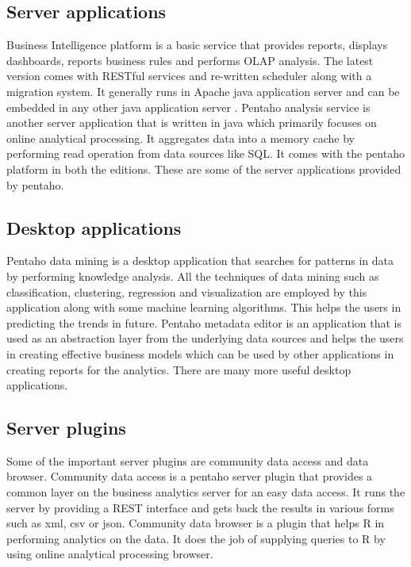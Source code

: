\documentclass[9pt,twocolumn,twoside]{styles/osajnl}
\begin{document}
\subsection{Server applications}

Business Intelligence platform is a basic service that provides
reports, displays dashboards, reports business rules and performs OLAP
analysis. The latest version comes with RESTful services and
re-written scheduler along with a migration system. It generally runs
in Apache java application server and can be embedded in any other
java application server \cite{pent1}. Pentaho analysis service is
another server application that is written in java which primarily
focuses on online analytical processing. It aggregates data into a
memory cache by performing read operation from data sources like
SQL. It comes with the pentaho platform in both the editions. These
are some of the server applications provided by pentaho.

\subsection{Desktop applications}

Pentaho data mining is a desktop application that searches for
patterns in data by performing knowledge analysis. All the techniques
of data mining such as classification, clustering, regression and
visualization are employed by this application along with some machine
learning algorithms. This helps the users in predicting the trends in
future. Pentaho metadata editor is an application that is used as an
abstraction layer from the underlying data sources and helps the users
in creating effective business models which can be used by other
applications in creating reports for the analytics. There are many
more useful desktop applications.
 
\subsection{Server plugins}

Some of the important server plugins are community data access and
data browser. Community data access is a pentaho server plugin that
provides a common layer on the business analytics server for an easy
data access. It runs the server by providing a REST interface and gets
back the results in various forms such as xml, csv or json. Community
data browser is a plugin that helps R in performing analytics on the
data. It does the job of supplying queries to R by using online
analytical processing browser.
\end{document}
